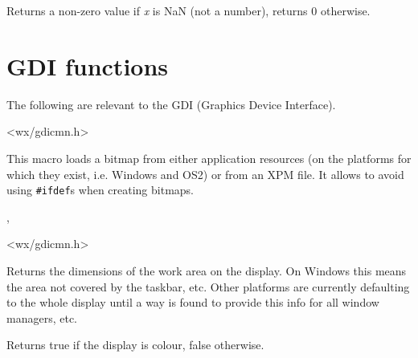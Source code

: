\label{wxisnan}


Returns a non-zero value if {\it x} is NaN (not a number), returns 0
otherwise.




\section{GDI functions}\label{gdifunctions}

The following are relevant to the GDI (Graphics Device Interface).


<wx/gdicmn.h>


\label{wxbitmapmacro}


This macro loads a bitmap from either application resources (on the platforms
for which they exist, i.e. Windows and OS2) or from an XPM file. It allows to
avoid using {\tt \#ifdef}s when creating bitmaps.


,


<wx/gdicmn.h>


\label{wxclientdisplayrect}



Returns the dimensions of the work area on the display.  On Windows
this means the area not covered by the taskbar, etc.  Other platforms
are currently defaulting to the whole display until a way is found to
provide this info for all window managers, etc.


\label{wxcolourdisplay}


Returns true if the display is colour, false otherwise.


\label{wxdisplaydepth}


